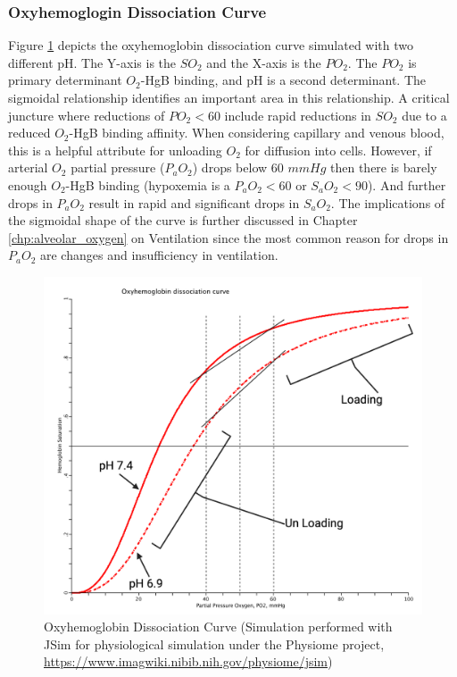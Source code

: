 \subsubsection{Oxyhemoglogin Dissociation Curve}

Figure \ref{fig:oxyhemo1} depicts the oxyhemoglobin dissociation curve simulated with two different pH. The Y-axis is the $SO_2$ and the X-axis is the $PO_2$. The $PO_2$ is primary determinant $O_2$-HgB binding, and pH is a second determinant. The sigmoidal relationship identifies an important area in this relationship. A critical juncture where reductions of $PO_2 < 60$ include rapid reductions in $SO_2$ due to a reduced $O_2$-HgB binding affinity. When considering capillary and venous blood, this is a helpful attribute for unloading $O_2$ for diffusion into cells. However, if arterial $O_2$ partial pressure ($P_aO_2$) drops below 60 $mmHg$ then there is barely enough $O_2$-HgB binding (hypoxemia is a $P_aO_2 <60$ or $S_aO_2 < 90$). And further drops in $P_aO_2$ result in rapid and significant drops in $S_aO_2$. The implications of the sigmoidal shape of the curve is further discussed in Chapter \ref{chp:alveolar_oxygen} on Ventilation since the most common reason for drops in $P_aO_2$ are changes and insufficiency in ventilation. 

\begin{figure}[!h]
    \centering
    \includegraphics[width=1.0\linewidth]{./figure/oxyhemo1.png}
    \caption{Oxyhemoglobin Dissociation Curve \footnotesize{(Simulation performed with JSim for physiological simulation under the Physiome project, \url{https://www.imagwiki.nibib.nih.gov/physiome/jsim}})}
    \label{fig:oxyhemo1}
\end{figure}

